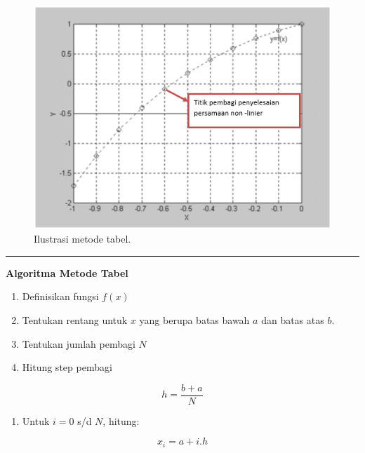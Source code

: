 \documentclass[
]{book}
\providecommand{\tightlist}{%
  \setlength{\itemsep}{0pt}\setlength{\parskip}{0pt}}
\theoremstyle{definition}
\theoremstyle{definition}
\theoremstyle{definition}
\theoremstyle{definition}
\theoremstyle{remark}
\begin{document}
\begin{figure}

{\centering \includegraphics[width=0.8\linewidth]{./images/tabelviz} 

}

\caption{Ilustrasi metode tabel.}\label{fig:tabelviz}
\end{figure}

\begin{center}\rule{0.5\linewidth}{0.5pt}\end{center}

\textbf{Algoritma Metode Tabel}

\begin{enumerate}
\def\labelenumi{\arabic{enumi}.}
\tightlist
\item
  Definisikan fungsi \(f\left(x \right)\)
\item
  Tentukan rentang untuk \(x\) yang berupa batas bawah \(a\) dan batas atas \(b\).
\item
  Tentukan jumlah pembagi \(N\)
\item
  Hitung step pembagi
\end{enumerate}

\begin{equation}
h=\frac{b+a}{N}
  \label{eq:tabel1}
\end{equation}

\begin{enumerate}
\def\labelenumi{\arabic{enumi}.}
\setcounter{enumi}{4}
\tightlist
\item
  Untuk \(i=0\) s/d \(N\), hitung:
\end{enumerate}

\begin{equation}
x_i=a+i.h
  \label{eq:tabel2}
\end{equation}
\end{document}
